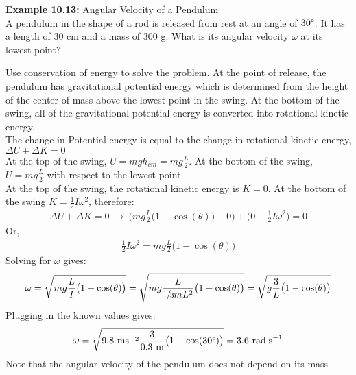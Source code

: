 \documentclass[a4paper]{article}
\let\bf\textbf
\newcommand\rads{\text{ rad\;s}^{-1}}
\newcommand\m{\text{ m}}
\newcommand\mss{\text{ ms}^{-2}}
\def\centerarc[#1](#2)(#3:#4:#5){\draw[#1] ($(#2)+({#5*cos(#3)},{#5*sin(#3)})$) arc (#3:#4:#5)}
\begin{document}
\newpage
\begin{shaded}
    \underline{\bf{Example 10.13:} Angular Velocity of a Pendulum}
    \vspace{2mm}\\
    A pendulum in the shape of a rod is released from rest at an angle of $30\degree$. It has a length of 30 cm and a mass of 300 g. What is its angular velocity $\omega$ at its lowest point?
    \begin{center}
    \end{center}
    Use conservation of energy to solve the problem. At the point of release, the pendulum has gravitational potential energy which is determined from the height of the center of mass above the lowest point in the swing. At the bottom of the swing, all of the gravitational potential energy is converted into rotational kinetic energy.
    \vspace{1mm}\\
    The change in Potential energy is equal to the change in rotational kinetic energy, $\Delta U + \Delta K = 0$\\
    At the top of the swing, $\displaystyle U = mgh_{cm} = mg\frac{L}{2}$. At the bottom of the swing, $\displaystyle U = mg\frac{L}{2}$ with respect to the lowest point\\
    At the top of the swing, the rotational kinetic energy is $K = 0$. At the bottom of the swing $K = \frac{1}{2}I\omega^2$, therefore:
    \begin{align*}
        \Delta U + \Delta K = 0\ \boldsymbol{\to}\ \Big(mg\frac{L}{2}\big(1 - \cos(\theta)\big) - 0\Big) + \Big(0 - \frac{1}{2}I\omega^2\Big) = 0
    \end{align*}
    Or,
    \begin{align*}
        \frac{1}{2}I\omega^2 = mg\frac{L}{2}\big(1 - \cos(\theta)\big)
    \end{align*}
    Solving for $\omega$ gives:
    \begin{align*}
        \omega = \sqrt{mg\frac{L}{I}\big(1 - \cos(\theta)\big)} =\sqrt{mg\frac{L}{\sfrac{1}{3}mL^2}\big(1 - \cos(\theta)\big)} = \sqrt{g\frac{3}{L}\big(1 - \cos(\theta)\big)}
    \end{align*}
    Plugging in the known values gives:
    \begin{align*}
        \omega = \sqrt{9.8\mss\frac{3}{0.3\m}\big(1 - \cos(30\degree)\big)} = 3.6\rads
    \end{align*}
    Note that the angular velocity of the pendulum does not depend on its mass
\end{shaded}
\end{document}
